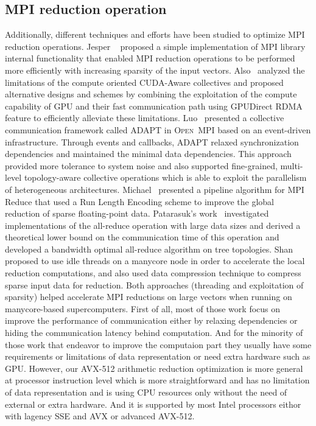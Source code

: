 \documentclass[sigconf,review]{acmart}
\newcommand{\ompi}[0]{\textsc{Open~MPI}\xspace}
\newcommand{\mpi}[0]{\textsc{MPI}\xspace}
\begin{document}
\subsection{\mpi reduction operation}
Additionally, different techniques and
efforts have been studied to optimize \mpi reduction operations. Jesper
~\cite{Neutral_MPI_Reduction} proposed a simple implementation of MPI library
internal functionality that enabled MPI reduction operations to be performed
more efficiently with increasing sparsity of the input vectors.
%
Also~\cite{gpu-reduce} analyzed the limitations of the compute oriented CUDA-Aware
collectives and proposed alternative designs and schemes by combining the exploitation of the
compute capability of GPU and their fast communication
path using GPUDirect RDMA feature to efficiently alleviate these limitations.
%
Luo~\cite{Luo-adapt} presented
 a collective communication framework called ADAPT in \ompi based on an event-driven infrastructure. Through events and callbacks, ADAPT relaxed synchronization dependencies and maintained the minimal data dependencies. This approach provided more tolerance to system noise and also supported fine-grained, multi-level topology-aware collective operations which is able to exploit the parallelism of heterogeneous architectures.
%
Michael~\cite{sparse-reduction} presented a pipeline algorithm for MPI Reduce
that used a Run Length Encoding scheme to improve the global reduction of sparse
floating-point data.
Patarasuk's work~\cite{all-reduce09} investigated implementations of the all-reduce operation
with large data sizes and derived a theoretical lower bound on the communication time of this operation and developed
a bandwidth optimal all-reduce algorithm on tree topologies.
%
Shan~\cite{shan-reduce} proposed to use idle threads on a manycore node in order to accelerate
the local reduction computations, and also used data compression technique to compress sparse input data for reduction.
Both approaches (threading and exploitation
of sparsity) helped accelerate MPI reductions on large vectors when
running on manycore-based supercomputers.
%
First of all, most of those work focus on improve the performance of communication either by relaxing dependencies or hiding the communication latency behind computation.
And for the minority of those work that endeavor to improve the computaion
part they usually have some requirements or limitations of data representation or need extra hardware such as GPU.
However, our AVX-512 arithmetic reduction
optimization is more general at processor instruction level which is more
straightforward and has no limitation of data representation and is using CPU resources only
without the need of external or extra hardware.
And it is supported by most Intel processors eithor with lagency SSE and AVX or advanced AVX-512.
\end{document}
